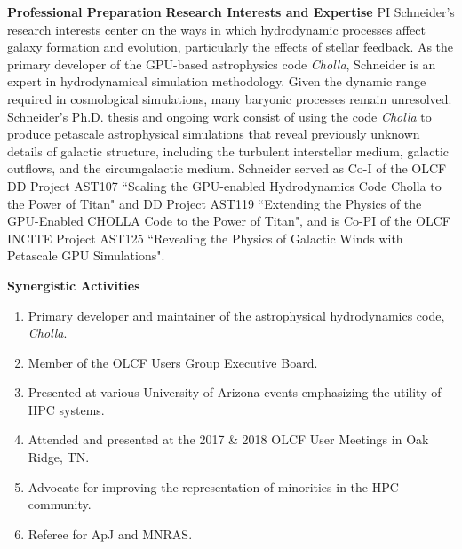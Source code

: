 \documentclass[11pt,letterpaper,english]{article}
\begin{document}
\begin{flushleft} {\bf Professional Preparation}
\vspace{-6pt}
{\bf Research Interests and Expertise}
{\parindent 16pt
PI Schneider's research interests center on the ways in which hydrodynamic processes affect galaxy formation and evolution, particularly the effects of stellar feedback. As the primary developer of the GPU-based astrophysics code \textit{Cholla}, Schneider is an expert in hydrodynamical simulation methodology. Given the dynamic range required in cosmological simulations, many baryonic processes remain unresolved. Schneider's Ph.D. thesis and ongoing work consist of using the code \textit{Cholla} to produce petascale astrophysical simulations that reveal previously unknown details of galactic structure, including the turbulent interstellar medium, galactic outflows, and the circumgalactic medium. Schneider served as Co-I of the OLCF DD Project AST107 ``Scaling the GPU-enabled Hydrodynamics Code Cholla to the Power of Titan" and DD Project AST119 ``Extending the Physics of the GPU-Enabled CHOLLA Code to the Power of Titan", and is Co-PI of the OLCF INCITE Project AST125 ``Revealing the Physics of Galactic Winds with Petascale GPU Simulations".
}

\vspace{.04in}
{\bf Synergistic Activities}
\vspace{-6pt}
\begin{enumerate} \itemsep1pt \parskip0pt 
\item Primary developer and maintainer of the astrophysical hydrodynamics code, \textit{Cholla}. \\ 
\item Member of the OLCF Users Group Executive Board. \\
\item Presented at various University of Arizona events emphasizing the utility of HPC systems. \\ 
\item Attended and presented at the 2017 \& 2018 OLCF User Meetings in Oak Ridge, TN. \\ 
\item Advocate for improving the representation of minorities in the HPC community. \\
\item Referee for ApJ and MNRAS. \\
\end{enumerate} 


\end{flushleft}
\end{document}
